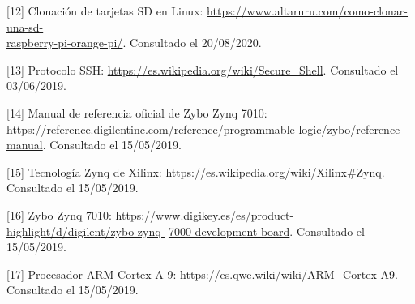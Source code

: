 \hspace{0.5cm}	[\hypertarget{12}{12}] Clonación de tarjetas SD en Linux: \url{https://www.altaruru.com/como-clonar-una-sd-}\\
	\url{raspberry-pi-orange-pi/}. Consultado el 20/08/2020.

\hspace{0.5cm}	[\hypertarget{13}{13}] Protocolo SSH: \url{https://es.wikipedia.org/wiki/Secure_Shell}. Consultado el 03/06/2019.

\hspace{0.5cm}	[\hypertarget{14}{14}] Manual de referencia oficial de Zybo Zynq 7010: \url{https://reference.digilentinc.com/reference/programmable-logic/zybo/reference-manual}. Consultado el 15/05/2019.

\hspace{0.5cm}	[\hypertarget{15}{15}] Tecnología Zynq de Xilinx: \url{https://es.wikipedia.org/wiki/Xilinx#Zynq}. Consultado el 15/05/2019.

\hspace{0.5cm}	[\hypertarget{16}{16}] Zybo Zynq 7010: \url{https://www.digikey.es/es/product-highlight/d/digilent/zybo-zynq-}
\url{7000-development-board}. Consultado el 15/05/2019.

\hspace{0.5cm}	[\hypertarget{17}{17}] Procesador ARM Cortex A-9: \url{https://es.qwe.wiki/wiki/ARM_Cortex-A9}. Consultado el 15/05/2019.

